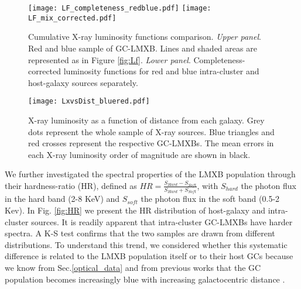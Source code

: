 \documentclass{aa}
\begin{document}
\begin{figure}[]
    \centering
    \texttt{[image: LF\_completeness\_redblue.pdf]}
    \texttt{[image: LF\_mix\_corrected.pdf]}
   
    \caption{Cumulative X-ray luminosity functions comparison. \textit{Upper panel}. Red and blue sample of GC-LMXB. Lines and shaded areas are represented as in Figure \ref{fig:Lf}. \textit{Lower panel}. Completeness-corrected luminosity functions for red and blue intra-cluster and host-galaxy sources separately.    
    }
    \label{fig:red_blue_LF}
\end{figure}




\begin{figure}[]
    \centering
    \texttt{[image: LxvsDist\_bluered.pdf]}
    \caption{X-ray luminosity as a function of distance from each galaxy. Grey dots represent the whole sample of X-ray sources. Blue triangles and red crosses represent the respective GC-LMXBs. The mean errors in each X-ray luminosity order of magnitude are shown in black.  }
    \label{fig:lxvsdist}
\end{figure}

We further investigated the spectral properties of the LMXB population through their hardness-ratio (HR), defined as $HR=\frac{S_{Hard}-S_{Soft}}{S_{Hard}+S_{Soft}}$, with $S_{hard}$ the photon flux in the hard band (2-8 KeV) and $S_{soft}$ the photon flux in the soft band (0.5-2 Kev). In Fig. \ref{fig:HR} we present the HR distribution of host-galaxy and intra-cluster sources. It is readily apparent that intra-cluster GC-LMXBs have harder spectra. A K-S test confirms that the two samples are drawn from different distributions. To understand this trend, we considered whether this systematic difference is related to the LMXB population itself or to their host GCs because we know from Sec.\ref{optical_data} and from previous works that the GC population becomes increasingly blue with increasing galactocentric distance \citep{Jordan2006, D'Abrusco2016, Cantiello2018, Cantiello2020}. 

\end{document}
